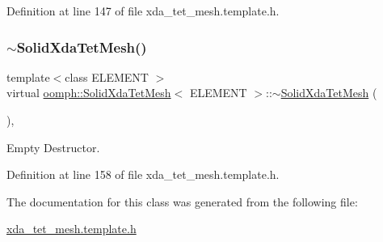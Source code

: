 Definition at line 147 of file xda\+\_\+tet\+\_\+mesh.\+template.\+h.

\mbox{\label{classoomph_1_1SolidXdaTetMesh_a9425d53bae183deb23fb3a1019a48ca8}} 
\subsubsection{\texorpdfstring{$\sim$\+Solid\+Xda\+Tet\+Mesh()}{~SolidXdaTetMesh()}}
{\footnotesize\ttfamily template$<$class E\+L\+E\+M\+E\+NT $>$ \\
virtual \hyperlink{classoomph_1_1SolidXdaTetMesh}{oomph\+::\+Solid\+Xda\+Tet\+Mesh}$<$ E\+L\+E\+M\+E\+NT $>$\+::$\sim$\hyperlink{classoomph_1_1SolidXdaTetMesh}{Solid\+Xda\+Tet\+Mesh} (\begin{DoxyParamCaption}{ }\end{DoxyParamCaption})\hspace{0.3cm}{\ttfamily [inline]}, {\ttfamily [virtual]}}



Empty Destructor. 



Definition at line 158 of file xda\+\_\+tet\+\_\+mesh.\+template.\+h.



The documentation for this class was generated from the following file\+:\begin{DoxyCompactItemize}
\item 
\hyperlink{xda__tet__mesh_8template_8h}{xda\+\_\+tet\+\_\+mesh.\+template.\+h}\end{DoxyCompactItemize}
